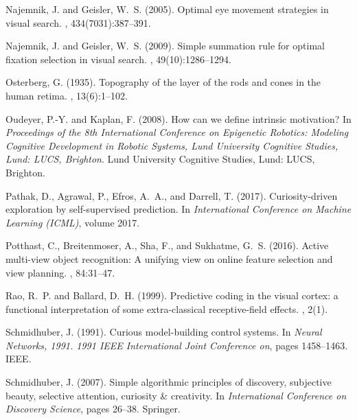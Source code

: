 \documentclass[12pt,twoside,openright]{article}
\begin{document}
{\begin{thebibliography}{}
	Najemnik, J. and Geisler, W.~S. (2005).
	\newblock Optimal eye movement strategies in visual search.
	, 434(7031):387--391.
	
	Najemnik, J. and Geisler, W.~S. (2009).
	\newblock Simple summation rule for optimal fixation selection in visual
	search.
	, 49(10):1286--1294.
	
	Osterberg, G. (1935).
	\newblock Topography of the layer of the rods and cones in the human retima.
	, 13(6):1--102.
	
	Oudeyer, P.-Y. and Kaplan, F. (2008).
	\newblock How can we define intrinsic motivation?
	\newblock In {\em Proceedings of the 8th International Conference on Epigenetic
		Robotics: Modeling Cognitive Development in Robotic Systems, Lund University
		Cognitive Studies, Lund: LUCS, Brighton}. Lund University Cognitive Studies,
	Lund: LUCS, Brighton.
	
	Pathak, D., Agrawal, P., Efros, A.~A., and Darrell, T. (2017).
	\newblock Curiosity-driven exploration by self-supervised prediction.
	\newblock In {\em International Conference on Machine Learning (ICML)}, volume
	2017.
	
	Potthast, C., Breitenmoser, A., Sha, F., and Sukhatme, G.~S. (2016).
	\newblock Active multi-view object recognition: A unifying view on online
	feature selection and view planning.
	, 84:31--47.
	
	Rao, R.~P. and Ballard, D.~H. (1999).
	\newblock Predictive coding in the visual cortex: a functional interpretation
	of some extra-classical receptive-field effects.
	, 2(1).
	
	Schmidhuber, J. (1991).
	\newblock Curious model-building control systems.
	\newblock In {\em Neural Networks, 1991. 1991 IEEE International Joint
		Conference on}, pages 1458--1463. IEEE.
	
	Schmidhuber, J. (2007).
	\newblock Simple algorithmic principles of discovery, subjective beauty,
	selective attention, curiosity \& creativity.
	\newblock In {\em International Conference on Discovery Science}, pages 26--38.
	Springer.
	

\end{thebibliography}}
\end{document}
